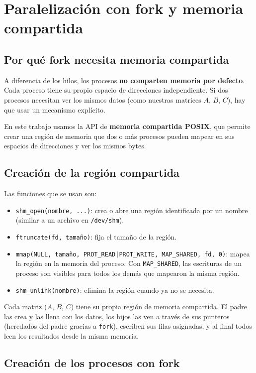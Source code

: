 \section{Paralelización con fork y memoria compartida}

\subsection{Por qué fork necesita memoria compartida}

A diferencia de los hilos, los procesos \textbf{no comparten memoria por defecto}. Cada proceso tiene su propio espacio de direcciones independiente. Si dos procesos necesitan ver los mismos datos (como nuestras matrices $A$, $B$, $C$), hay que usar un mecanismo explícito.

En este trabajo usamos la API de \textbf{memoria compartida POSIX}, que permite crear una región de memoria que dos o más procesos pueden mapear en sus espacios de direcciones y ver los mismos bytes.

\subsection{Creación de la región compartida}

Las funciones que se usan son:

\begin{itemize}
    \item \texttt{shm\_open(nombre, ...)}: crea o abre una región identificada por un nombre (similar a un archivo en \texttt{/dev/shm}).
    \item \texttt{ftruncate(fd, tamaño)}: fija el tamaño de la región.
    \item \texttt{mmap(NULL, tamaño, PROT\_READ|PROT\_WRITE, MAP\_SHARED, fd, 0)}: mapea la región en la memoria del proceso. Con \texttt{MAP\_SHARED}, las escrituras de un proceso son visibles para todos los demás que mapearon la misma región.
    \item \texttt{shm\_unlink(nombre)}: elimina la región cuando ya no se necesita.
\end{itemize}

Cada matriz ($A$, $B$, $C$) tiene su propia región de memoria compartida. El padre las crea y las llena con los datos, los hijos las ven a través de sus punteros (heredados del padre gracias a \texttt{fork}), escriben sus filas asignadas, y al final todos leen los resultados desde la misma memoria.

\subsection{Creación de los procesos con fork}


